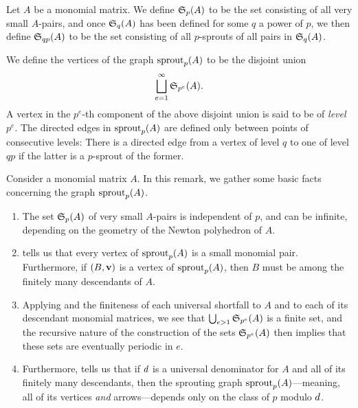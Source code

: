 \documentclass{amsart}
\begin{document}
\begin{definition}
   Let $A$ be a monomial matrix.
   We define $\mathfrak{S}_p(A)$ to be the set consisting of all very small $A$-pairs, and once $\mathfrak{S}_q(A)$ has been defined for some $q$ a power of $p$, we then define $\mathfrak{S}_{qp}(A)$ to be the set consisting of all $p$-sprouts of all pairs in $\mathfrak{S}_q(A)$.

   We define the vertices of the graph $\operatorname{sprout}_p(A)$ to be the disjoint union
   \[ \bigsqcup_{e=1}^{\infty} \mathfrak{S}_{p^e}(A). \]
   A vertex in the $p^e$-th component of the above disjoint union is said to be of \emph{level} $p^e$.
   The directed edges in $\operatorname{sprout}_p(A)$ are defined only between points of consecutive levels:
   There is a directed edge from a vertex of level $q$ to one of level $qp$ if the latter is a $p$-sprout of the former.
\end{definition}

\begin{remark}
   \label{elementary1: R}
   Consider a monomial matrix $A$.
   In this remark, we gather some basic facts concerning the graph $\operatorname{sprout}_p(A)$.
\begin{enumerate}
\item The set $\mathfrak{S}_p(A)$ of very small $A$-pairs is independent of $p$, and can be infinite, depending on the geometry of the Newton polyhedron of $A$.

\item \label{elementary1 small pairs}  tells us that every vertex of $\operatorname{sprout}_p(A)$ is a small monomial pair.  Furthermore, if $(B,\mathbf{v})$ is a vertex of $\operatorname{sprout}_p(A)$, then $B$ must be among the finitely many descendants of $A$.

\item \label{elementary1 periodic in e} Applying  and the finiteness of each universal shortfall to $A$ and to each of its descendant monomial matrices, we see that $\bigcup_{e>1} \mathfrak{S}_{p^e}(A)$ is a finite set, and the recursive nature of the construction of the sets $\mathfrak{S}_{p^e}(A)$ then implies that these sets are eventually periodic in $e$.

\item \label{elementary1 periodic in p} Furthermore,  tells us that if $d$ is a universal denominator for $A$ and all of its finitely many descendants, then the sprouting graph  $\operatorname{sprout}_p(A)$---meaning, all of its vertices \emph{and} arrows---depends only on the class of $p$ modulo $d$.
\end{enumerate}
\end{remark}
\end{document}
